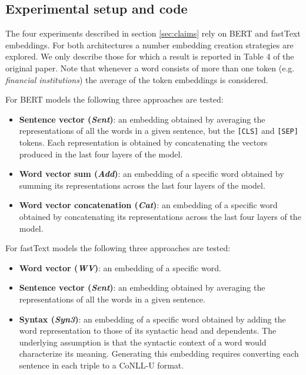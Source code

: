 \subsection{Experimental setup and code}
The four experiments described in section \ref{sec:claims} rely on BERT and fastText embeddings. For both architectures a number embedding creation strategies are explored. We only describe those for which a result is reported in Table 4 of the original paper. Note that whenever a word consists of more than one token (e.g. \textit{financial institutions}) the average of the token embeddings is considered.

For BERT models the following three approaches are tested:
\begin{itemize}
    \item \textbf{Sentence vector (\textit{Sent})}: an embedding obtained by averaging the representations of all the words in a given sentence, but the \texttt{[CLS]} and \texttt{[SEP]} tokens. Each representation is obtained by concatenating the vectors produced in the last four layers of the model.

    \item \textbf{Word vector sum (\textit{Add})}: an embedding of a specific word obtained by summing its representations across the last four layers of the model.

    \item \textbf{Word vector concatenation (\textit{Cat})}: an embedding of a specific word obtained by concatenating its representations across the last four layers of the model.

\end{itemize}

For fastText models the following three approaches are tested:
\begin{itemize}
    \item \textbf{Word vector (\textit{WV})}: an embedding of a specific word.

    \item \textbf{Sentence vector (\textit{Sent})}: an embedding obtained by averaging the representations of all the words in a given sentence.

    \item \textbf{Syntax (\textit{Syn3})}: an embedding of a specific word obtained by adding the word representation to those of its syntactic head and dependents. The underlying assumption is that the syntactic context of a word would characterize its meaning. Generating this embedding requires converting each sentence in each triple to a CoNLL-U format.

\end{itemize}

